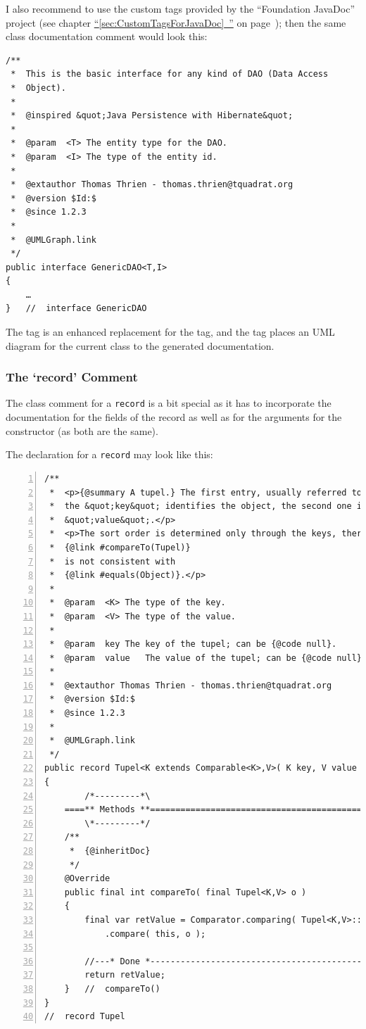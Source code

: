 \documentclass[11pt,a4paper, titlepage, parskip=half, headsepline, footsepline, cleardoublepage=current, headheight=1cm]{scrbook}
\newcommand*{\tqfullvref}[1]{\hyperref[{#1}]{“\ref*{#1}~\nameref*{#1}”} on page~\pageref{#1}}
\begin{document}
I also recommend to use the custom tags provided by the “Foundation JavaDoc” project\autocite{TQUADRAT_ORG_FOUNDATION_JAVADOC} (see chapter \tqfullvref{sec:CustomTagsForJavaDoc}); then the same class documentation comment would look this:
\begin{lstlisting}
/**
 *  This is the basic interface for any kind of DAO (Data Access
 *  Object).
 * 
 *  @inspired &quot;Java Persistence with Hibernate&quot;
 *
 *  @param  <T> The entity type for the DAO.
 *  @param  <I> The type of the entity id.
 *
 *  @extauthor Thomas Thrien - thomas.thrien@tquadrat.org
 *  @version $Id:$
 *  @since 1.2.3
 *
 *  @UMLGraph.link
 */
public interface GenericDAO<T,I>
{
    …
}   //  interface GenericDAO
\end{lstlisting}
The tag  is an enhanced replacement for the  tag, and the tag  places an UML diagram for the current class to the generated documentation.


\subsubsection{The ‘record’ Comment}\label{sec:RecordComment}
The class comment for a \lstinline|record| is a bit special as it has to incorporate the documentation for the fields of the record as well as for the arguments for the constructor (as both are the same).

The declaration for a \lstinline|record| may look like this:
\begin{lstlisting}[numbers=left,caption={A tupel class}]
/**
 *  <p>{@summary A tupel.} The first entry, usually referred to as 
 *  the &quot;key&quot; identifies the object, the second one is the
 *  &quot;value&quot;.</p>
 *  <p>The sort order is determined only through the keys, therefore
 *  {@link #compareTo(Tupel)}
 *  is not consistent with
 *  {@link #equals(Object)}.</p>
 *
 *  @param  <K> The type of the key.
 *  @param  <V> The type of the value.
 *
 *  @param  key The key of the tupel; can be {@code null}.
 *  @param  value   The value of the tupel; can be {@code null}.
 *
 *  @extauthor Thomas Thrien - thomas.thrien@tquadrat.org
 *  @version $Id:$
 *  @since 1.2.3
 *
 *  @UMLGraph.link
 */
public record Tupel<K extends Comparable<K>,V>( K key, V value ) implements Comparable<Tupel<K,V>
{
        /*---------*\
    ====** Methods **================================================
        \*---------*/
    /**
     *  {@inheritDoc} 
     */
    @Override
    public final int compareTo( final Tupel<K,V> o )
    {
        final var retValue = Comparator.comparing( Tupel<K,V>::key )
            .compare( this, o ); 

        //---* Done *------------------------------------------------
        return retValue;
    }   //  compareTo()
}
//  record Tupel
\end{lstlisting}
\end{document}

